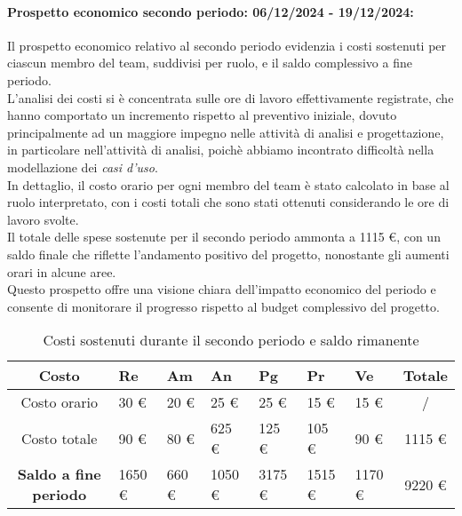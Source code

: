 \paragraph{Prospetto economico secondo periodo: 06/12/2024 - 19/12/2024: }
Il prospetto economico relativo al secondo periodo evidenzia i costi sostenuti per ciascun membro del team, suddivisi per ruolo, e il saldo complessivo a fine periodo.\\
L'analisi dei costi si è concentrata sulle ore di lavoro effettivamente registrate, che hanno comportato un incremento rispetto al preventivo iniziale, dovuto principalmente ad un maggiore 
impegno nelle attività di analisi e progettazione, in particolare nell'attività di analisi, poichè abbiamo incontrato difficoltà nella modellazione dei \emph{casi d'uso}. \\
In dettaglio, il costo orario per ogni membro del team è stato calcolato in base al ruolo interpretato, con i costi totali che sono stati ottenuti considerando le ore di lavoro svolte. \\
Il totale delle spese sostenute per il secondo periodo ammonta a 1115 \euro, con un saldo finale che riflette l'andamento positivo del progetto, nonostante gli aumenti orari in alcune aree.\\
Questo prospetto offre una visione chiara dell'impatto economico del periodo e consente di monitorare il progresso rispetto al budget complessivo del progetto.
\begin{table}[!h]
    \centering
    \renewcommand{\arraystretch}{1.5}
    \begin{tabularx}{\textwidth}{|c|X|X|X|X|X|X|c|}\hline
    \rowcolor[HTML]{FFD700} 
    \textbf{Costo} & \textbf{Re} & \textbf{Am} & \textbf{An} & \textbf{Pg} & \textbf{Pr} & \textbf{Ve} & \textbf{Totale} \\ \hline
    Costo orario & 30 \euro & 20 \euro & 25 \euro & 25 \euro & 15 \euro & 15 \euro & /  \\ \hline
    Costo totale & 90 \euro & 80 \euro & 625 \euro & 125 \euro & 105 \euro & 90 \euro & 1115 \euro \\ \hline
    \rowcolor[HTML]{FFD700} 
    \textbf{Saldo a fine periodo}  & 1650 \euro & 660 \euro  & 1050 \euro & 3175 \euro & 1515 \euro & 1170 \euro & 9220 \euro \\ \hline
    \end{tabularx}
    \caption{Costi sostenuti durante il secondo periodo e saldo rimanente}
\end{table}


